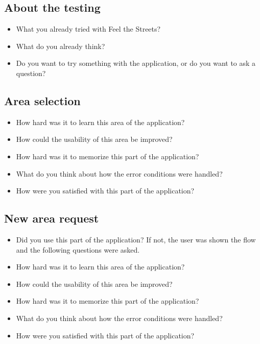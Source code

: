 \documentclass[nolof,digital]{fithesis3}
\begin{document}
\subsection{About the testing}
\begin{itemize}
\item What you already tried with Feel the Streets?
\item What do you already think?
\item Do you want to try something with the application, or do you want to ask a question?
\end{itemize}
\subsection{Area selection}
\begin{itemize}
\item How hard was it to learn this area of the application?
\item How could the usability of this area be improved?
\item How hard was it to memorize this part of the application?
\item What do you think about how the error conditions were handled?
\item How were you satisfied with this part of the application?
\end{itemize}
\subsection{New area request}
\begin{itemize}
\item Did you use this part of the application? If not, the user was shown the flow and the following questions were asked.
\item How hard was it to learn this area of the application?
\item How could the usability of this area be improved?
\item How hard was it to memorize this part of the application?
\item What do you think about how the error conditions were handled?
\item How were you satisfied with this part of the application?
\end{itemize}
\end{document}
